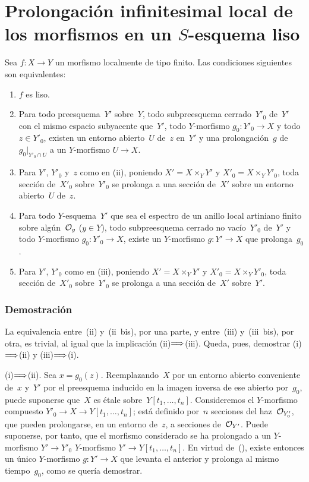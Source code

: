 
\section[Prolongación infinitesimal local de los morfismos]{Prolongación infinitesimal local de los morfismos en un $S$-esquema liso}
\label{III.3}

\begin{theoreme}
\label{III.3.1}
Sea $f\colon X\to Y$ un morfismo localmente de tipo finito. Las condiciones siguientes son equivalentes:
\begin{enumerate}
\item[(i)] $f$ es liso.
\item[(ii)] Para todo preesquema~$Y'$ sobre~$Y$, todo subpreesquema cerrado~$Y'_0$ de~$Y'$ con el mismo espacio subyacente que~$Y'$, todo $Y$-morfismo $g_0\colon Y'_0\to X$ y todo $z\in Y'_0$, existen un entorno abierto~$U$ de~$z$ en~$Y'$ y una prolongación~$g$ de $g_0|_{Y'_0\cap U}$ a un $Y$-morfismo $U\to X$.
\item[(ii~bis)] Para $Y'$, $Y'_0$ y~$z$ como en \textup{(ii)}, poniendo $X'=X\times_Y Y'$ y $X'_0=X\times_Y Y'_0$, toda sección de~$X'_0$ sobre~$Y'_0$ se prolonga a una sección de~$X'$ sobre un entorno abierto~$U$ de~$z$.
\item[(iii)] Para todo $Y$-esquema~$Y'$ que sea el espectro de un anillo local artiniano finito sobre algún~$\cal{O}_y$ ($y\in Y$), todo subpreesquema cerrado no vacío~$Y'_0$ de~$Y'$ y todo $Y$-morfismo $g_0\colon Y'_0\to X$, existe un $Y$-morfismo $g\colon Y'\to X$ que prolonga~$g_0$.
\item[(iii~bis)] Para $Y'$, $Y'_0$ como en \textup{(iii)}, poniendo $X'=X\times_Y Y'$ y $X'_0=X\times_Y Y'_0$, toda sección de~$X'_0$ sobre~$Y'_0$ se prolonga a una sección de~$X'$ sobre~$Y'$.
\end{enumerate}
\end{theoreme}

\subsubsection*{Demostración}
La equivalencia entre~(ii) y~(ii~bis), por una parte, y entre~(iii) y~(iii~bis), por otra, es trivial, al igual que la implicación (ii)$\To$(iii). Queda, pues, demostrar (i)$\To$(ii) y (iii)$\To$(i).

(i)$\To$(ii). Sea $x=g_0(z)$. Reemplazando~$X$ por un entorno abierto conveniente de~$x$ y~$Y'$ por el preesquema inducido en la imagen inversa de ese abierto por~$g_0$, puede suponerse que~$X$ es étale sobre~$Y[t_1,\dots,t_n]$. Consideremos el $Y$-morfismo compuesto $Y'_0\to X\to Y[t_1,\dots,t_n]$; está definido por~$n$ secciones del haz~$\cal{O}_{Y'_0}$, que pueden prolongarse, en un entorno de~$z$, a secciones de~$\cal{O}_{Y'}$. Puede suponerse, por tanto, que
el morfismo considerado se ha prolongado a un
{$Y$-morfismo $Y'\to Y'_0$}
{$Y$-morfismo $Y'\to Y[t_1,\dots,t_n]$}.
En virtud de~(), existe entonces un único $Y$-morfismo $g\colon Y'\to X$ que levanta el anterior y prolonga al mismo tiempo~$g_0$, como se quería demostrar.

